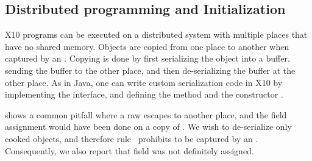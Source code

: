 \subsection{Distributed programming and Initialization}
\label{Section:Multiple-Places}
X10 programs can be executed on a distributed system with multiple places
    that have no shared memory.
Objects are copied from one place to another when captured by an .
Copying is done by first serializing the object into a buffer,
    sending the buffer to the other place, and then de-serializing the buffer at the other place.
As in Java, one can write custom serialization code in X10 by implementing the  interface,
    and defining the method  and the constructor .


 shows a common pitfall
    where a raw \this escapes to another place,
    and the field assignment would have been done on a copy of \this.
We wish to de-serialize only cooked objects,
    and therefore rule~ prohibits \this to be captured by an .
Consequently, we also report that field  was not definitely assigned.



